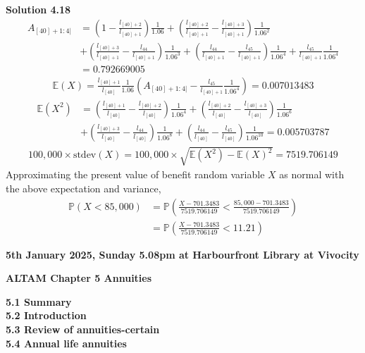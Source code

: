 \documentclass[hidelinks, 12pt]{article}
\theoremstyle{mydefstyle}
\theoremstyle{mythmstyle}
\begin{document}
\textbf{Solution 4.18}
\begin{align*}
A_{[40]+1:4|}
&= \left( 1 - \frac{l_{[40]+2}}{l_{[40]+1}} \right) \frac{1}{1.06}
+ \left( \frac{l_{[40]+2}}{l_{[40]+1}} - \frac{l_{[40]+3}}{l_{[40]+1}} \right) \frac{1}{1.06^2} \\
&+ \left( \frac{l_{[40]+3}}{l_{[40]+1}}  - \frac{l_{44}}{l_{[40]+1}} \right) \frac{1}{1.06^3}
+ \left( \frac{l_{44}}{l_{[40]+1}} - \frac{l_{45}}{l_{[40]+1}} \right) \frac{1}{1.06^4} 
+ \frac{l_{45}}{l_{[40]+1}} \frac{1}{1.06^4} \\
&= 0.792669005
\end{align*}
\begin{gather*}
\mathbb{E}(X) = \frac{l_{[40]+1}}{l_{[40]}} \frac{1}{1.06} \left(A_{[40]+1:4|} - \frac{l_{45}}{l_{[40]+1}} \frac{1}{1.06^4} \right)
= 0.007013483
\end{gather*}
\begin{align*}
\mathbb{E}(X^2)
&= \left( \frac{l_{[40]+1}}{l_{[40]}} - \frac{l_{[40]+2}}{l_{[40]}} \right) \frac{1}{1.06^4}
+ \left( \frac{l_{[40]+2}}{l_{[40]}} - \frac{l_{[40]+3}}{l_{[40]}} \right) \frac{1}{1.06^6} \\
&+ \left( \frac{l_{[40]+3}}{l_{[40]}}  - \frac{l_{44}}{l_{[40]}} \right) \frac{1}{1.06^8}
+ \left( \frac{l_{44}}{l_{[40]}} - \frac{l_{45}}{l_{[40]}} \right) \frac{1}{1.06^{10}}  = 0.005703787
\end{align*}
\begin{gather*}
100,000 \times \mbox{stdev}(X) 
= 100,000 \times \sqrt{\mathbb{E}(X^2) - \mathbb{E}(X)^2} 
= 7519.706149
\end{gather*}
\color{red}
Approximating the present value of benefit random variable $X$ as normal with the above expectation and variance, 
\begin{align*}
\mathbb{P}(X < 85,000)
&= \mathbb{P} \left( \frac{X - 701.3483}{7519.706149} < \frac{85,000 - 701.3483}{7519.706149} \right) \\
&= \mathbb{P} \left( \frac{X - 701.3483}{7519.706149} < 11.21\right)
\end{align*}
\color{black}

\textbf{5th January 2025, Sunday 5.08pm at Harbourfront Library at Vivocity}

\textbf{ALTAM Chapter 5 Annuities}

\textbf{5.1 Summary} \\
\textbf{5.2 Introduction} \\
\textbf{5.3 Review of annuities-certain} \\
\textbf{5.4 Annual life annuities}
\end{document}
